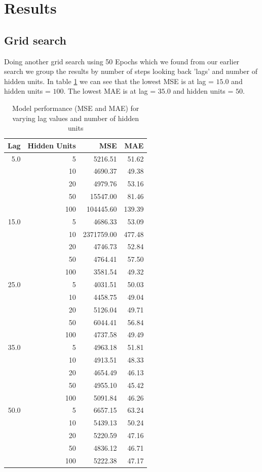 \documentclass[conference]{IEEEtran}
\begin{document}
\section{Results}
\subsection{Grid search}
Doing another grid search using 50 Epochs which we found from our earlier search we group the results by
number of steps looking back 'lags' and number of hidden units. In table \ref{tab:lag_hidden_performance} we can see that
the lowest MSE is at lag = $15.0$ and hidden units = $100$. The lowest MAE is at lag = $35.0$ and hidden units = $50$.

\begin{table}[h!]
    \centering
    \begin{tabular}{r r r r}
    \hline
    \textbf{Lag} & \textbf{Hidden Units} & \textbf{MSE} & \textbf{MAE} \\
    \hline
    5.0  & 5   & 5216.51  & 51.62 \\
      & 10  & 4690.37  & 49.38 \\
      & 20  & 4979.76  & 53.16 \\
      & 50  & 15547.00 & 81.46 \\
      & 100 & 104445.60 & 139.39 \\
    \hline
    15.0  & 5   & 4686.33  & 53.09 \\
      & 10  & 2371759.00 & 477.48 \\
      & 20  & 4746.73  & 52.84 \\
      & 50  & 4764.41  & 57.50 \\
      & 100 & 3581.54  & 49.32 \\
    \hline
    25.0  & 5   & 4031.51  & 50.03 \\
      & 10  & 4458.75  & 49.04 \\
      & 20  & 5126.04  & 49.71 \\
      & 50  & 6044.41  & 56.84 \\
      & 100 & 4737.58  & 49.49 \\
    \hline
    35.0  & 5   & 4963.18  & 51.81 \\
      & 10  & 4913.51  & 48.33 \\
      & 20  & 4654.49  & 46.13 \\
      & 50  & 4955.10  & 45.42 \\
      & 100 & 5091.84  & 46.26 \\
    \hline
    50.0  & 5   & 6657.15  & 63.24 \\
      & 10  & 5439.13  & 50.24 \\
      & 20  & 5220.59  & 47.16 \\
      & 50  & 4836.12  & 46.71 \\
      & 100 & 5222.38  & 47.17 \\
    \hline
    \end{tabular}
    \caption{Model performance (MSE and MAE) for varying lag values and number of hidden units}
    \label{tab:lag_hidden_performance}
\end{table}
    
\end{document}
